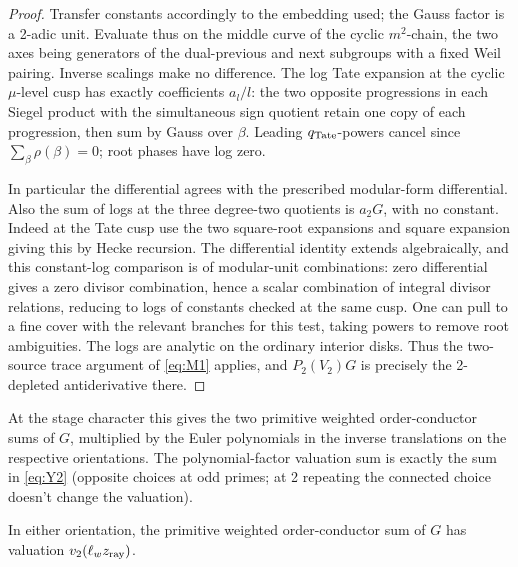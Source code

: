 \begin{proof}
Transfer constants accordingly to the embedding used; the Gauss factor is a
2-adic unit. Evaluate thus on the middle curve of the cyclic \(m^2\)-chain,
the two axes being generators of the dual-previous and next subgroups with a
fixed Weil pairing. Inverse scalings make no difference. The log Tate
expansion at the cyclic \(\mu\)-level cusp has exactly coefficients \(a_l/l\):
the two opposite progressions in each Siegel product with the simultaneous
sign quotient retain one copy of each progression, then sum by Gauss over
\(\beta\). Leading \(q_{\rm Tate}\)-powers cancel since
\(\sum_\beta\rho(\beta)=0\); root phases have log zero.

In particular the differential agrees with the prescribed modular-form
differential. Also the sum of logs at the three degree-two quotients is \(a_2
G\), with no constant. Indeed at the Tate cusp use the two square-root
expansions and square expansion giving this by Hecke recursion. The
differential identity extends algebraically, and this constant-log comparison
is of modular-unit combinations: zero differential gives a zero divisor
combination, hence a scalar combination of integral divisor relations,
reducing to logs of constants checked at the same cusp. One can pull to a fine
cover with the relevant branches for this test, taking powers to remove root
ambiguities. The logs are analytic on the ordinary interior disks. Thus the
two-source trace argument of \eqref{eq:M1} applies, and \(P_2(V_2)G\) is
precisely the 2-depleted antiderivative there.
\end{proof}

At the stage character this gives the two primitive weighted order-conductor
sums of \(G\), multiplied by the Euler polynomials in the inverse translations
on the respective orientations. The polynomial-factor valuation sum is exactly
the sum in \eqref{eq:Y2} (opposite choices at odd primes; at 2 repeating the
connected choice doesn't change the valuation).

\begin{lemma}\label{cyclic:ray-labels}
In either orientation, the primitive weighted order-conductor sum of
\(G\) has valuation \(v_2(\ell_wz_{\rm ray})\).
\end{lemma}

